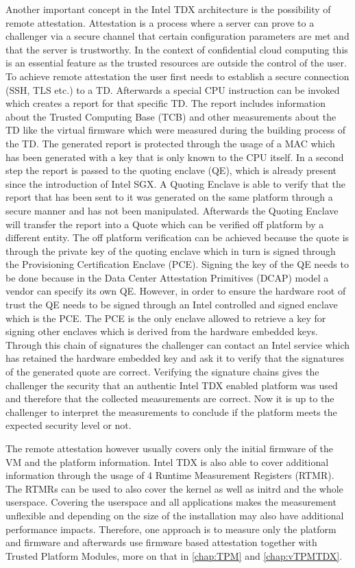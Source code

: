 \documentclass[sigplan,screen,nonacm]{acmart}
\begin{document}
Another important concept in the Intel TDX architecture is the possibility of remote attestation.
Attestation is a process where a server can prove to a challenger via a secure channel that certain configuration parameters are met and that the server is trustworthy.
In the context of confidential cloud computing this is an essential feature as the trusted resources are outside the control of the user.
To achieve remote attestation the user first needs to establish a secure connection (SSH, TLS etc.) to a TD.
Afterwards a special CPU instruction can be invoked which creates a report for that specific TD.
The report includes information about the Trusted Computing Base (TCB) and other measurements about the TD like the virtual firmware which were measured during the building process of the TD.
The generated report is protected through the usage of a MAC which has been generated with a key that is only known to the CPU itself.
In a second step the report is passed to the quoting enclave (QE), which is already present since the introduction of Intel SGX.
A Quoting Enclave is able to verify that the report that has been sent to it was generated on the same platform through a secure manner and has not been manipulated.
Afterwards the Quoting Enclave will transfer the report into a Quote which can be verified off platform by a different entity.
The off platform verification can be achieved because the quote is through the private key of the quoting enclave which in turn is signed through the Provisioning Certification Enclave (PCE).
Signing the key of the QE needs to be done because in the Data Center Attestation Primitives (DCAP) model a vendor can specify its own QE.
However, in order to ensure the hardware root of trust the QE needs to be signed through an Intel controlled and signed enclave which is the PCE.
The PCE is the only enclave allowed to retrieve a key for signing other enclaves which is derived from the hardware embedded keys\cite{Intel-QVL}.
Through this chain of signatures the challenger can contact an Intel service which has retained the hardware embedded key and ask it to verify that the signatures of the generated quote are correct.
Verifying the signature chains gives the challenger the security that an authentic Intel TDX enabled platform was used and therefore that the collected measurements are correct.
Now it is up to the challenger to interpret the measurements to conclude if the platform meets the expected security level or not.

The remote attestation however usually covers only the initial firmware of the VM and the platform information\cite{CA-KVM}.
Intel TDX is also able to cover additional information through the usage of 4 Runtime Measurement Registers (RTMR)\cite{CA-KVM}.
The RTMRs can be used to also cover the kernel as well as initrd and the whole userspace.
Covering the userspace and all applications makes the measurement unflexible and depending on the size of the installation may also have additional performance impacts\cite{CA-KVM}.
Therefore, one approach is to measure only the platform and firmware and afterwards use firmware based attestation together with Trusted Platform Modules, more on that in \cref{chap:TPM} and \cref{chap:vTPMTDX}.
\end{document}
